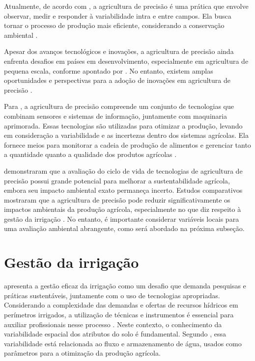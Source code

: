 Atualmente, de acordo com \textcite{Lamine_precision2024}, a agricultura de precisão é uma prática que envolve observar, medir e responder à variabilidade intra e entre campos. Ela busca tornar o processo de produção mais eficiente, considerando a conservação ambiental \parencite{Lamine_precision2024}. 

Apesar dos avanços tecnológicos e inovações, a agricultura de precisão ainda enfrenta desafios em países em desenvolvimento, especialmente em agricultura de pequena escala, conforme apontado por \textcite{Lamine_precision2024}. No entanto, existem amplas oportunidades e perspectivas para a adoção de inovações em agricultura de precisão \parencite{Lamine_precision2024}.

Para \textcite{Gebbers_precision2010}, a agricultura de precisão compreende um conjunto de tecnologias que combinam sensores e sistemas de informação, juntamente com maquinaria aprimorada. Essas tecnologias são utilizadas para otimizar a produção, levando em consideração a variabilidade e as incertezas dentro dos sistemas agrícolas. Ela fornece meios para monitorar a cadeia de produção de alimentos e gerenciar tanto a quantidade quanto a qualidade dos produtos agrícolas \parencite{Gebbers_precision2010}.

\textcite{Francisco_precision2024} demonstraram que a avaliação do ciclo de vida de tecnologias de agricultura de precisão possui grande potencial para melhorar a sustentabilidade agrícola, embora seu impacto ambiental exato permaneça incerto. Estudos comparativos mostraram que a agricultura de precisão pode reduzir significativamente os impactos ambientais da produção agrícola, especialmente no que diz respeito à gestão da irrigação \parencite{Francisco_precision2024}. No entanto, é importante considerar variáveis locais para uma avaliação ambiental abrangente, como será abordado na próxima subseção.

\section{Gestão da irrigação}

\textcite{Burton_irrigation2010} apresenta a gestão eficaz da irrigação como um desafio que demanda pesquisas e práticas sustentáveis, juntamente com o uso de tecnologias apropriadas. 
Considerando a complexidade das demandas e ofertas de recursos hídricos em perímetros irrigados, a utilização de técnicas e instrumentos é essencial para auxiliar profissionais nesse processo \parencite{Ramos_irrigacao2022}. Neste contexto, o conhecimento da variabilidade espacial dos atributos do solo é fundamental. Segundo \textcite{Ramos_irrigacao2022}, essa variabilidade está relacionada ao fluxo e armazenamento de água, usados como parâmetros para a otimização da produção agrícola.


